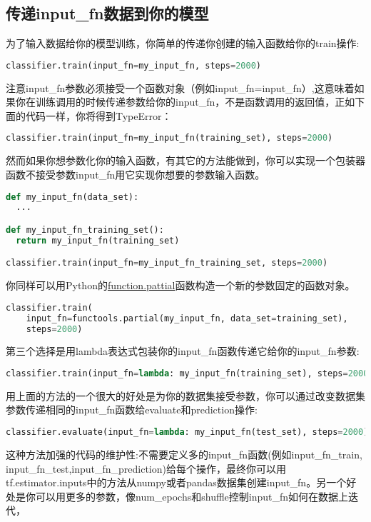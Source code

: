 \subsection{传递input\_fn数据到你的模型}
为了输入数据给你的模型训练，你简单的传递你创建的输入函数给你的train操作:
\begin{lstlisting}[language=Python]
classifier.train(input_fn=my_input_fn, steps=2000)
\end{lstlisting}
注意input\_fn参数必须接受一个函数对象（例如input\_fn=input\_fn）,这意味着如果你在训练调用的时候传递参数给你的input\_fn，不是函数调用的返回值，正如下面的代码一样，你将得到TypeError：
\begin{lstlisting}[language=Python]
classifier.train(input_fn=my_input_fn(training_set), steps=2000)
\end{lstlisting}
然而如果你想参数化你的输入函数，有其它的方法能做到，你可以实现一个包装器函数不接受参数input\_fn用它实现你想要的参数输入函数。
\begin{lstlisting}[language=Python]
def my_input_fn(data_set):
  ...

def my_input_fn_training_set():
  return my_input_fn(training_set)

classifier.train(input_fn=my_input_fn_training_set, steps=2000)
\end{lstlisting}
你同样可以用Python的\href{https://docs.python.org/2/library/functools.html#functools.partial}{function.pattial}函数构造一个新的参数固定的函数对象。
\begin{lstlisting}[language=Python]
classifier.train(
    input_fn=functools.partial(my_input_fn, data_set=training_set),
    steps=2000)
\end{lstlisting}
第三个选择是用lambda表达式包装你的input\_fn函数传递它给你的input\_fn参数:
\begin{lstlisting}[language=Python]
classifier.train(input_fn=lambda: my_input_fn(training_set), steps=2000)
\end{lstlisting}
用上面的方法的一个很大的好处是为你的数据集接受参数，你可以通过改变数据集参数传递相同的input\_fn函数给evaluate和prediction操作:
\begin{lstlisting}[language=Python]
classifier.evaluate(input_fn=lambda: my_input_fn(test_set), steps=2000)
\end{lstlisting}
这种方法加强的代码的维护性:不需要定义多的input\_fn函数(例如input\_fn\_train,\newline
input\_fn\_test,input\_fn\_prediction)给每个操作，最终你可以用tf.estimator.inputs中的方法从numpy或者pandas数据集创建input\_fn。另一个好处是你可以用更多的参数，像num\_epochs和shuffle控制input\_fn如何在数据上迭代，
